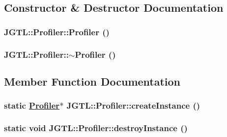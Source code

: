 \subsection{Constructor \& Destructor Documentation}
\hypertarget{class_j_g_t_l_1_1_profiler_8e373e2c712a2828e5384e9079958f9f}{
\subsubsection[Profiler]{\setlength{\rightskip}{0pt plus 5cm}JGTL::Profiler::Profiler ()}}
\label{class_j_g_t_l_1_1_profiler_8e373e2c712a2828e5384e9079958f9f}


\hypertarget{class_j_g_t_l_1_1_profiler_d3678f506e4d2342604423fa035930be}{
\subsubsection[$\sim$Profiler]{\setlength{\rightskip}{0pt plus 5cm}JGTL::Profiler::$\sim$Profiler ()}}
\label{class_j_g_t_l_1_1_profiler_d3678f506e4d2342604423fa035930be}




\subsection{Member Function Documentation}
\hypertarget{class_j_g_t_l_1_1_profiler_a88c187ec0ec5d886eb0fb6bee98b7e5}{
\subsubsection[createInstance]{\setlength{\rightskip}{0pt plus 5cm}static \hyperlink{class_j_g_t_l_1_1_profiler}{Profiler}$\ast$ JGTL::Profiler::create\-Instance ()}}
\label{class_j_g_t_l_1_1_profiler_a88c187ec0ec5d886eb0fb6bee98b7e5}


\hypertarget{class_j_g_t_l_1_1_profiler_cb990d68355312b6cd7a1f494e4dd33c}{
\subsubsection[destroyInstance]{\setlength{\rightskip}{0pt plus 5cm}static void JGTL::Profiler::destroy\-Instance ()}}
\label{class_j_g_t_l_1_1_profiler_cb990d68355312b6cd7a1f494e4dd33c}




